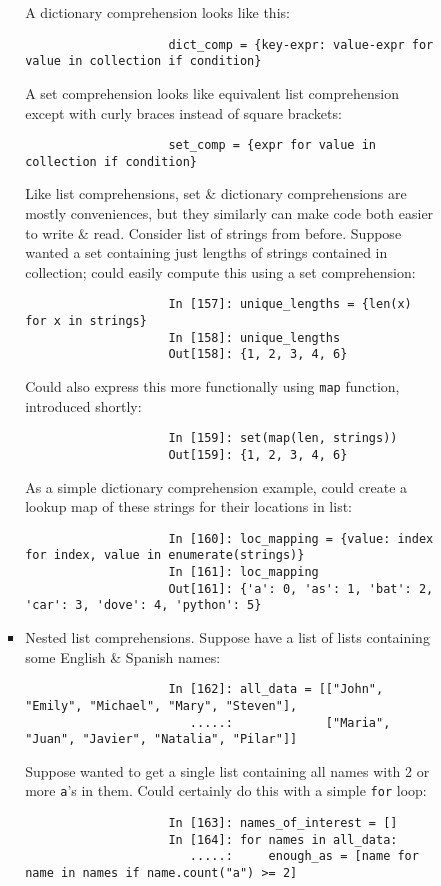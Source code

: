 \documentclass{article}
\begin{document}
\begin{enumerate}
\begin{itemize}
\begin{itemize}
\begin{itemize}
				A dictionary comprehension looks like this:
				\begin{verbatim}
					dict_comp = {key-expr: value-expr for value in collection if condition}
				\end{verbatim}
				A set comprehension looks like equivalent list comprehension except with curly braces instead of square brackets:
				\begin{verbatim}
					set_comp = {expr for value in collection if condition}
				\end{verbatim}
				Like list comprehensions, set \& dictionary comprehensions are mostly conveniences, but they similarly can make code both easier to write \& read. Consider list of strings from before. Suppose wanted a set containing just lengths of strings contained in collection; could easily compute this using a set comprehension:
				\begin{verbatim}
					In [157]: unique_lengths = {len(x) for x in strings}
					In [158]: unique_lengths
					Out[158]: {1, 2, 3, 4, 6}
				\end{verbatim}
				Could also express this more functionally using {\tt map} function, introduced shortly:
				\begin{verbatim}
					In [159]: set(map(len, strings))
					Out[159]: {1, 2, 3, 4, 6}
				\end{verbatim}
				As a simple dictionary comprehension example, could create a lookup map of these strings for their locations in list:
				\begin{verbatim}
					In [160]: loc_mapping = {value: index for index, value in enumerate(strings)}
					In [161]: loc_mapping
					Out[161]: {'a': 0, 'as': 1, 'bat': 2, 'car': 3, 'dove': 4, 'python': 5}
				\end{verbatim}
				\item {\sf Nested list comprehensions.} Suppose have a list of lists containing some English \& Spanish names:
				\begin{verbatim}
					In [162]: all_data = [["John", "Emily", "Michael", "Mary", "Steven"],
					   .....:             ["Maria", "Juan", "Javier", "Natalia", "Pilar"]]
				\end{verbatim}
				Suppose wanted to get a single list containing all names with 2 or more {\tt a}'s in them. Could certainly do this with a simple {\tt for} loop:
				\begin{verbatim}
					In [163]: names_of_interest = []
					In [164]: for names in all_data:
					   .....:     enough_as = [name for name in names if name.count("a") >= 2]

\end{verbatim}
\end{itemize}
\end{itemize}
\end{itemize}
\end{enumerate}
\end{document}
